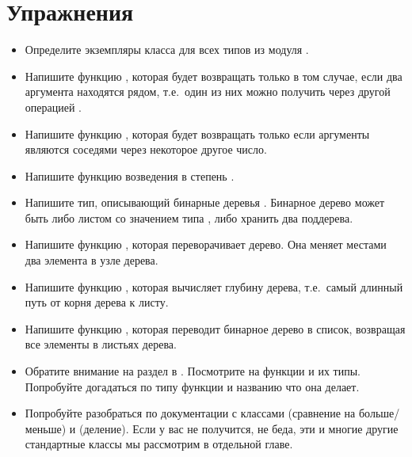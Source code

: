 
\section{Упражнения}

\begin{itemize}

\item Определите экземпляры класса  для всех типов из
        модуля .

\item Напишите функцию , которая
        будет возвращать  только в том случае, если
        два аргумента находятся рядом, т.е.~один из них можно
        получить через другой операцией .

\item Напишите функцию , которая
        будет возвращать  только если аргументы
        являются соседями через некоторое другое число. 

\item Напишите функцию возведения в степень .

\item Напишите тип, описывающий бинарные деревья . 
        Бинарное дерево может быть либо листом со значением типа ,
        либо хранить два поддерева.

\item Напишите функцию ,
        которая переворачивает дерево. Она меняет местами два элемента
        в узле дерева.

\item Напишите функцию , которая
        вычисляет глубину дерева, т.е.~самый длинный путь от корня дерева
        к листу.

\item Напишите функцию , которая
        переводит бинарное дерево в список, возвращая все элементы
        в листьях дерева.  

\item Обратите внимание на раздел  в . 
        Посмотрите на функции и их типы. Попробуйте догадаться
        по типу функции и названию что она делает.

\item Попробуйте разобраться по документации с классами 
        (сравнение на больше/меньше) и  (деление).
        Если у вас не получится, не беда, эти и многие другие
        стандартные классы мы рассмотрим в отдельной главе.

\end{itemize}
